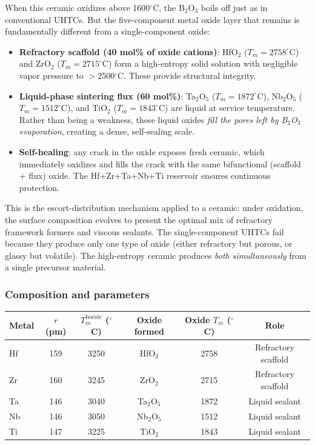 \documentclass[12pt,letterpaper]{article}
\theoremstyle{definition}
\begin{document}
When this ceramic oxidizes above 1600$^\circ$C, the B$_2$O$_3$ boils off just as in conventional UHTCs.  But the five-component metal oxide layer that remains is fundamentally different from a single-component oxide:

\begin{itemize}
  \item \textbf{Refractory scaffold (40 mol\% of oxide cations)}: HfO$_2$ ($T_m = 2758^\circ$C) and ZrO$_2$ ($T_m = 2715^\circ$C) form a high-entropy solid solution with negligible vapor pressure to $>$2500$^\circ$C.  These provide structural integrity.

  \item \textbf{Liquid-phase sintering flux (60 mol\%)}: Ta$_2$O$_5$ ($T_m = 1872^\circ$C), Nb$_2$O$_5$ ($T_m = 1512^\circ$C), and TiO$_2$ ($T_m = 1843^\circ$C) are liquid at service temperature.  Rather than being a weakness, these liquid oxides \emph{fill the pores left by B$_2$O$_3$ evaporation}, creating a dense, self-sealing scale.

  \item \textbf{Self-healing}: any crack in the oxide exposes fresh ceramic, which immediately oxidizes and fills the crack with the same bifunctional (scaffold + flux) oxide.  The Hf+Zr+Ta+Nb+Ti reservoir ensures continuous protection.
\end{itemize}

This is the escort-distribution mechanism applied to a ceramic: under oxidation, the surface composition evolves to present the optimal mix of refractory framework formers and viscous sealants.  The single-component UHTCs fail because they produce only one type of oxide (either refractory but porous, or glassy but volatile).  The high-entropy ceramic produces \emph{both simultaneously} from a single precursor material.

\subsubsection{Composition and parameters}

\begin{center}
\begin{tabular}{@{}lccccc@{}}
\toprule
Metal & $r$ (pm) & $T_m^{\mathrm{boride}}$ ($^\circ$C) & Oxide formed & Oxide $T_m$ ($^\circ$C) & Role \\
\midrule
Hf & 159 & 3250 & HfO$_2$ & 2758 & Refractory scaffold \\
Zr & 160 & 3245 & ZrO$_2$ & 2715 & Refractory scaffold \\
Ta & 146 & 3040 & Ta$_2$O$_5$ & 1872 & Liquid sealant \\
Nb & 146 & 3050 & Nb$_2$O$_5$ & 1512 & Liquid sealant \\
Ti & 147 & 3225 & TiO$_2$ & 1843 & Liquid sealant \\
\bottomrule
\end{tabular}
\end{center}
\end{document}
